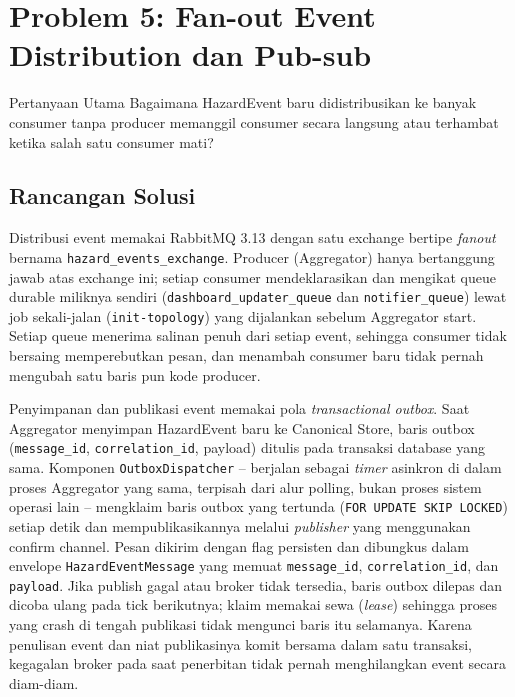 \section{Problem 5: Fan-out Event Distribution dan Pub-sub}
\begin{infobox}{Pertanyaan Utama}
Bagaimana HazardEvent baru didistribusikan ke banyak consumer tanpa producer
memanggil consumer secara langsung atau terhambat ketika salah satu consumer
mati?
\end{infobox}

\subsection{Rancangan Solusi}
Distribusi event memakai RabbitMQ 3.13 dengan satu exchange bertipe \textit{fanout}
bernama \texttt{hazard\_events\_exchange}. Producer (Aggregator) hanya bertanggung
jawab atas exchange ini; setiap consumer mendeklarasikan dan mengikat queue durable
miliknya sendiri (\texttt{dashboard\_updater\_queue} dan \texttt{notifier\_queue})
lewat job sekali-jalan (\texttt{init-topology}) yang dijalankan sebelum Aggregator
start. Setiap queue menerima salinan penuh dari setiap event, sehingga consumer tidak
bersaing memperebutkan pesan, dan menambah consumer baru tidak pernah mengubah satu
baris pun kode producer.

Penyimpanan dan publikasi event memakai pola \textit{transactional outbox}. Saat
Aggregator menyimpan HazardEvent baru ke Canonical Store, baris outbox
(\texttt{message\_id}, \texttt{correlation\_id}, payload) ditulis pada transaksi
database yang sama. Komponen \texttt{OutboxDispatcher} -- berjalan sebagai
\textit{timer} asinkron di dalam proses Aggregator yang sama, terpisah dari alur
polling, bukan proses sistem operasi lain -- mengklaim baris outbox yang tertunda
(\texttt{FOR UPDATE SKIP LOCKED}) setiap detik dan mempublikasikannya melalui
\textit{publisher} yang menggunakan confirm channel.
Pesan dikirim dengan flag persisten dan dibungkus dalam envelope
\texttt{HazardEventMessage} yang memuat \texttt{message\_id}, \texttt{correlation\_id},
dan \texttt{payload}. Jika publish gagal atau broker tidak tersedia, baris outbox
dilepas dan dicoba ulang pada tick berikutnya; klaim memakai sewa (\textit{lease})
sehingga proses yang crash di tengah publikasi tidak mengunci baris itu selamanya.
Karena penulisan event dan niat publikasinya komit bersama dalam satu transaksi,
kegagalan broker pada saat penerbitan tidak pernah menghilangkan event secara diam-diam.

